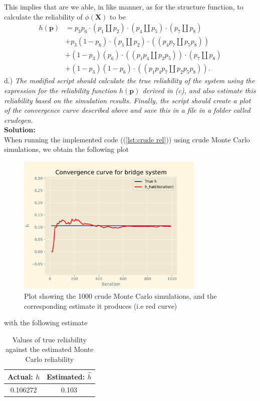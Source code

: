 \documentclass[12pt,
               a4paper,
               article,
               oneside,
               english,oldfontcommands]{memoir}
\let\oldref\ref
\renewcommand{\ref}[1]{(\oldref{#1})}
\newcommand{\spaze}{\vspace{4mm}\\}
\begin{document}
This implies that are we able, in like manner, as for the structure function, to calculate the reliability of $\phi(\bm{X})$ to be 
\begin{align*}
h(\bm{p}) &= p_3 p_6 \cdot \left( p_1 \coprod p_2 \right) \cdot \left(p_4 \coprod p_5 \right)\cdot \left(p_7 \coprod p_8 \right) \\[5pt]
&+ p_3 (1- p_6) \cdot \left( p_1 \coprod p_2 \right) \cdot \left( \left( p_4 p_7 \coprod p_5 p_8 \right) \right) \\[5pt]
&+ (1 - p_3 )(p_6) \cdot \left( \left(p_1p_4 \coprod p_2 p_5 \right) \right) \cdot \left( p_7 \coprod p_8 \right) \\[5pt]
&+ (1 - p_3 )(1 - p_6) \cdot \left( \left(p_1p_4p_7 \coprod p_2 p_5 p_8 \right) \right).
\end{align*}
d.) \emph{The modified script should calculate the true reliability of the system using the expression for the reliability function $h(\bm{p})$ derived in (c), and also estimate this reliability based on the simulation results. Finally, the script should create a plot of the convergence curve described above and save this in a file in a folder called crudegen.} \spaze 
\textbf{Solution:} \spaze 
When running the implemented code (\ref{lst:crude rel}) using crude Monte Carlo simulations, we obtain the following plot 
\begin{figure}[H]
\centering 
\includegraphics[width=0.8\textwidth]{crudegen/bridge.pdf}
\caption{Plot showing the 1000 crude Monte Carlo simulations, and the corresponding estimate it produces (i.e red curve)}
\end{figure}
with the following estimate 
\begin{table}[H] 
  \begin{center} 
    \label{tab:c mont rel}
    \begin{tabular}{c c} 
      \textbf{Actual:} $h$ & \textbf{Estimated}: $\hat{h}$ \\
      \hline
       0.106272 &  0.103 \\
      \hline 
    \end{tabular}
     \caption{Values of true reliability against the estimated Monte Carlo reliability}
  \end{center}
\end{table}
\end{document}
